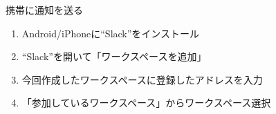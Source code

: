 \documentclass[dvipdfmx,xcolor={svgnames}]{beamer}
\begin{document}
  \begin{frame}{携帯に通知を送る}
    \begin{enumerate}\setlength{\itemsep}{15pt}
      \item Android/iPhoneに``Slack''をインストール
      \item ``Slack''を開いて「ワークスペースを追加」
      \item 今回作成したワークスペースに登録したアドレスを入力
      \item 「参加しているワークスペース」からワークスペース選択
    \end{enumerate}
  \end{frame}
\end{document}
